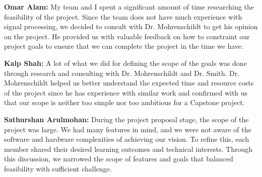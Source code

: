 \documentclass{article}
\begin{document}
\begin{enumerate}
    \textbf{Omar Alam:} My team and I spent a significant amount of time researching the feasibility of the project. Since the team does not have much
    experience with signal processing, we decided to consult with Dr. Mohrenschildt to get his opinion on the project. He provided us with valuable feedback on how
    to constraint our project goals to ensure that we can complete the project in the time we have.
    
    \textbf{Kalp Shah:} A lot of what we did for defining the scope of the goals was done through research and consulting with Dr. Mohrenschildt and Dr. Smith.
    Dr. Mohrenschildt helped us better understand the expected time and resource costs of the project since he has experience with similar work and confirmed
    with us that our scope is neither too simple nor too ambitious for a Capstone project.

    \textbf{Sathurshan Arulmohan:} During the project proposal stage, the scope of the project was large.
    We had many features in mind, and we were not aware of the software and hardware complexities of achieving our vision.
    To refine this, each member shared their desired learning outcomes and technical interests.
    Through this discussion, we narrowed the scope of features and goals that balanced feasibility with sufficient challenge.

\end{enumerate}  
\end{document}

